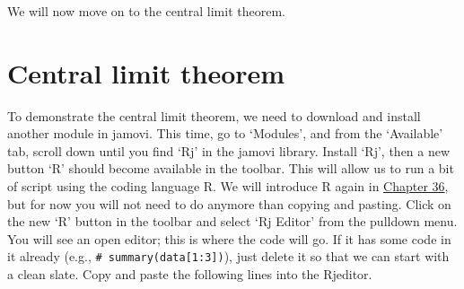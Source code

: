 \documentclass[
  openany]{scrbook}
\begin{document}
\begin{verbatim}






\end{verbatim}

We will now move on to the central limit theorem.

\hypertarget{central-limit-theorem}{%
\section{Central limit theorem}\label{central-limit-theorem}}

To demonstrate the central limit theorem, we need to download and install another module in jamovi.
This time, go to `Modules', and from the `Available' tab, scroll down until you find `Rj' in the jamovi library.
Install `Rj', then a new button `R' should become available in the toolbar.
This will allow us to run a bit of script using the coding language R.
We will introduce R again in \protect\hyperlink{Chapter_36}{Chapter 36}, but for now you will not need to do anymore than copying and pasting.
Click on the new `R' button in the toolbar and select `Rj Editor' from the pulldown menu.
You will see an open editor; this is where the code will go.
If it has some code in it already (e.g., \texttt{\#\ summary(data{[}1:3{]})}), just delete it so that we can start with a clean slate.
Copy and paste the following lines into the Rjeditor.
\end{document}
